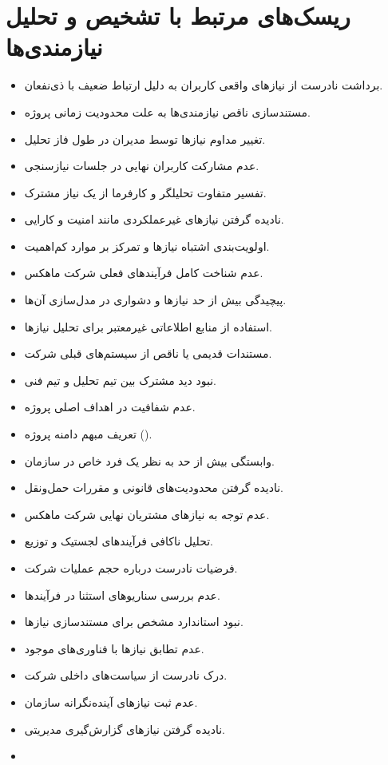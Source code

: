 \documentclass[12pt,a4paper]{report}
\begin{document}
\section{ریسک‌های مرتبط با تشخیص و تحلیل نیازمندی‌ها}
\begin{itemize}
	\item 
برداشت نادرست از نیازهای واقعی کاربران به دلیل ارتباط ضعیف با ذی‌نفعان.
\item 
مستندسازی ناقص نیازمندی‌ها به علت محدودیت زمانی پروژه.
\item 
تغییر مداوم نیازها توسط مدیران در طول فاز تحلیل.
\item 
عدم مشارکت کاربران نهایی در جلسات نیازسنجی.
\item 
تفسیر متفاوت تحلیلگر و کارفرما از یک نیاز مشترک.
\item 
نادیده گرفتن نیازهای غیرعملکردی مانند امنیت و کارایی.
\item 
اولویت‌بندی اشتباه نیازها و تمرکز بر موارد کم‌اهمیت.
\item 
عدم شناخت کامل فرآیندهای فعلی شرکت ماهکس.
\item 
پیچیدگی بیش از حد نیازها و دشواری در مدل‌سازی آن‌ها.
\item 
استفاده از منابع اطلاعاتی غیرمعتبر برای تحلیل نیازها.
\item 
مستندات قدیمی یا ناقص از سیستم‌های قبلی شرکت.
\item 
نبود دید مشترک بین تیم تحلیل و تیم فنی.
\item 
عدم شفافیت در اهداف اصلی پروژه.
\item 
تعریف مبهم دامنه پروژه ().
\item 
وابستگی بیش از حد به نظر یک فرد خاص در سازمان.
\item 
نادیده گرفتن محدودیت‌های قانونی و مقررات حمل‌ونقل.
\item 
عدم توجه به نیازهای مشتریان نهایی شرکت ماهکس.
\item 
تحلیل ناکافی فرآیندهای لجستیک و توزیع.
\item 
فرضیات نادرست درباره حجم عملیات شرکت.
\item 
عدم بررسی سناریوهای استثنا در فرآیندها.
\item 
نبود استاندارد مشخص برای مستندسازی نیازها.
\item 
عدم تطابق نیازها با فناوری‌های موجود.
\item 
درک نادرست از سیاست‌های داخلی شرکت.
\item 
عدم ثبت نیازهای آینده‌نگرانه سازمان.
\item 
نادیده گرفتن نیازهای گزارش‌گیری مدیریتی.
\item 

\end{itemize}
\end{document}
